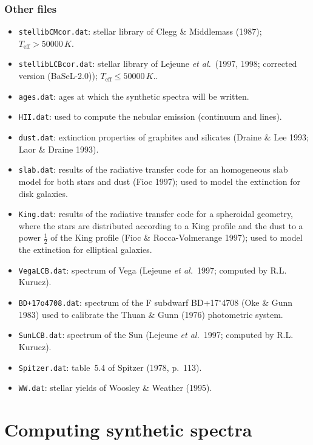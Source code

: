 \documentclass[11pt,draft,fleqn]{article}
\begin{document}
\subsubsection{Other files}
\begin{itemize}
\item \texttt{stellibCMcor.dat}: stellar library of Clegg \&
Middlemass (1987); $T_{\mathrm{eff}}>50000\,K$.
\item \texttt{stellibLCBcor.dat}: stellar library of Lejeune \emph{et
al.}\ (1997, 1998; corrected 
version (BaSeL-2.0)); $T_{\mathrm{eff}}\le 50000\,K$..
\item \texttt{ages.dat}: ages at which the synthetic spectra will be written.
\item \texttt{HII.dat}: used to compute the nebular emission (continuum and lines).
\item \texttt{dust.dat}: extinction properties of graphites and
silicates (Draine \& Lee 1993; Laor \& Draine 1993).
\item \texttt{slab.dat}: results of the radiative transfer code for an 
 homogeneous slab model for both stars and dust (Fioc 1997);
used to model the extinction for disk galaxies.
\item \texttt{King.dat}: results of the radiative transfer code for a 
spheroidal geometry, where the stars are distributed
according to a King profile and the dust to a power 
$\frac{1}{2}$ of the King profile (Fioc \& Rocca-$\!$Volmerange 1997);
used to model the extinction for elliptical galaxies.
\item \texttt{VegaLCB.dat}: spectrum of Vega (Lejeune \emph{et
al.}\ 1997; computed by R.L. Kurucz).
\item \texttt{BD+17o4708.dat}: spectrum of the F subdwarf
BD+17$^{\circ}$4708 (Oke \& Gunn 1983)
used to calibrate the Thuan \& Gunn (1976) photometric system.
\item \texttt{SunLCB.dat}: spectrum of the Sun (Lejeune \emph{et
al.}\ 1997; computed by R.L. Kurucz).
\item \texttt{Spitzer.dat}: table~5.4 of Spitzer (1978, p.~113).
\item \texttt{WW.dat}: stellar yields of Woosley \& Weather (1995).
\end{itemize}
\section{Computing synthetic spectra}
\end{document}
